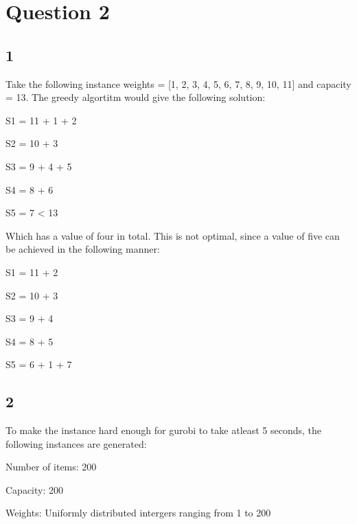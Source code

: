 \section*{Question 2}
\subsection*{1}
Take the following instance weights = [1, 2, 3, 4, 5, 6, 7, 8, 9, 10, 11] and capacity = 13. The greedy algortitm would give the following solution:
\begin{description}
	\item S1 = 11 + 1 + 2
	\item S2 = 10 + 3
	\item S3 = 9 + 4 + 5
	\item S4 = 8 + 6
	\item S5 = 7 < 13
\end{description}
Which has a value of four in total. This is not optimal, since a value of five can be achieved in the following manner:
\begin{description}
	\item S1 = 11 + 2
	\item S2 = 10 + 3
	\item S3 = 9 + 4
	\item S4 = 8 + 5
	\item S5 = 6 + 1 + 7
\end{description}
\subsection*{2}
To make the instance hard enough for gurobi to take atleast 5 seconds, the following instances are generated:
\begin{description}
	\item Number of items: 200
	\item Capacity: 200
	\item Weights: Uniformly distributed intergers ranging from 1 to 200
\end{description}
